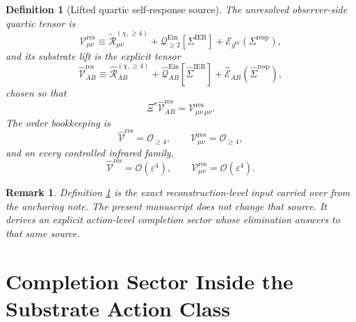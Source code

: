 \documentclass[11pt]{article}
\newcommand{\ObserverMap}{\Xi}
\newcommand{\ObserverMetric}{g^{\mathrm{br}}}
\newcommand{\BaseShift}{\Sigma^{\mathrm{IER}}}
\newcommand{\ResponseShift}{\Sigma^{\mathrm{resp}}}
\newcommand{\BaseLift}{\widehat\Sigma^{\mathrm{IER}}}
\newcommand{\ResponseLift}{\widehat\Sigma^{\mathrm{resp}}}
\newcommand{\ReLongFour}{\widetilde{\mathcal R}_{\mu\nu}^{(\chi,\ge 4)}}
\newcommand{\ResidualCore}{\mathcal V_{\mu\nu}^{\mathrm{res}}}
\newcommand{\ResidualLift}{\widehat{\mathcal V}^{\mathrm{res}}}
\newcommand{\EinLin}{\mathcal E_{\ObserverMetric}}
\newcommand{\EinQuad}{\mathcal Q_{\ge 2}^{\mathrm{Ein}}}
\newcommand{\epsIR}{\varepsilon}
\newtheorem{definition}{Definition}
\newtheorem{remark}{Remark}
\begin{document}
\begin{definition}[Lifted quartic self-response source]
\label{def:source}
The unresolved observer-side quartic tensor is
\begin{equation}
\ResidualCore
\equiv
\ReLongFour
+\EinQuad[\BaseShift]
+\EinLin(\ResponseShift),
\label{eq:vres}
\end{equation}
and its substrate lift is the explicit tensor
\begin{equation}
\ResidualLift_{AB}
\equiv
\widehat{\mathcal R}_{AB}^{(\chi,\ge 4)}
+\widehat{\mathcal Q}_{AB}^{\mathrm{Ein}}[\BaseLift]
+\widehat{\mathcal E}_{AB}(\ResponseLift),
\label{eq:liftedsource}
\end{equation}
chosen so that
\begin{equation}
\ObserverMap^*\ResidualLift_{AB}
=
\ResidualCore{}_{\mu\nu}.
\label{eq:sourcepull}
\end{equation}
The order bookkeeping is
\begin{equation}
\ResidualLift=\mathcal O_{\ge 4},
\qquad
\ResidualCore=\mathcal O_{\ge 4},
\label{eq:sourceorder}
\end{equation}
and on every controlled infrared family,
\begin{equation}
\ResidualLift=\mathcal O(\epsIR^4),
\qquad
\ResidualCore=\mathcal O(\epsIR^4).
\label{eq:sourceIR}
\end{equation}
\end{definition}

\begin{remark}
Definition \ref{def:source} is the exact reconstruction-level input carried over from the anchoring note. The present manuscript does not change that source. It derives an explicit action-level completion sector whose elimination answers to that same source.
\end{remark}

\section{Completion Sector Inside the Substrate Action Class}
\end{document}
